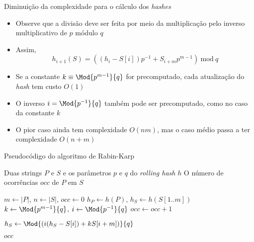 \begin{frame}[fragile]{Diminuição da complexidade para o cálculo dos {\it hashes}}

    \begin{itemize}
        \item Observe que a divisão deve ser feita por meio da multiplicação pelo inverso
            multiplicativo de $p$ módulo $q$

        \item Assim,
        \[
            h_{i+1}(S) = \left((h_{i} - S[i])p^{-1} + S_{i+m}p^{m -1}\right)\ \mbox{mod}\ q
        \]

        \item Se a constante $k\equiv \Mod{p^{m-1}}{q}$ for precomputado, cada atualização do
            \textit{hash} tem custo $O(1)$

        \item O inverso $i = \Mod{p^{-1}}{q}$ também pode ser precomputado, como no caso da constante $k$

        \item O pior caso ainda tem complexidade $O(nm)$, mas o caso médio passa a ter
            complexidade $O(n + m)$

    \end{itemize}

\end{frame}

\begin{frame}[fragile]{Pseudocódigo do algoritmo de Rabin-Karp}

    \begin{algorithm}[H]
        \caption{Algoritmo de Rabin-Karp com \textit{Rolling Hash}}
        \begin{algorithmic}[1]
            \Require Duas strings $P$ e $S$ e os parâmetros $p$ e $q$ do \textit{rolling hash} $h$
            \Ensure O número de ocorrências $occ$ de $P$ em $S$

                \State $m \gets |P|$, $n \gets |S|$, $occ \gets 0$
                \State $h_P \gets h(P)$, $h_S \gets h(S[1..m])$
                \State $k \gets \Mod{p^{m - 1}}{q}$, $i \gets \Mod{p^{-1}}{q}$
                \State
                            \State $occ \gets occ + 1$
                        \EndIf
                    \EndIf

                        \State $h_S \gets \Mod{\left(i(h_S - S[i]) + kS[i + m]\right)}{q}$
                    \EndIf
                \EndFor

                \State \Return $occ$
            \EndFunction
        \end{algorithmic}
    \end{algorithm}

\end{frame}


